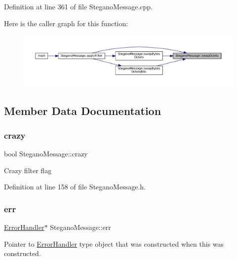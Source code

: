 Definition at line 361 of file Stegano\+Message.\+cpp.

Here is the caller graph for this function\+:\nopagebreak
\begin{figure}[H]
\begin{center}
\leavevmode
\includegraphics[width=350pt]{classSteganoMessage_a4751ad396485b5859b84970ddd20290d_icgraph}
\end{center}
\end{figure}


\subsection{Member Data Documentation}
\mbox{\label{classSteganoMessage_aa66c9e1d0367981d42ede819e1a51131}} 
\subsubsection{\texorpdfstring{crazy}{crazy}}
{\footnotesize\ttfamily bool Stegano\+Message\+::crazy\hspace{0.3cm}{\ttfamily [private]}}

Crazy filter flag 

Definition at line 158 of file Stegano\+Message.\+h.

\mbox{\label{classSteganoMessage_a26b631e00716be7a89cbcf22cf0b7291}} 
\subsubsection{\texorpdfstring{err}{err}}
{\footnotesize\ttfamily \mbox{\hyperlink{classErrorHandler}{Error\+Handler}}$\ast$ Stegano\+Message\+::err\hspace{0.3cm}{\ttfamily [private]}}

Pointer to \mbox{\hyperlink{classErrorHandler}{Error\+Handler}} type object that was constructed when this was constructed. 


